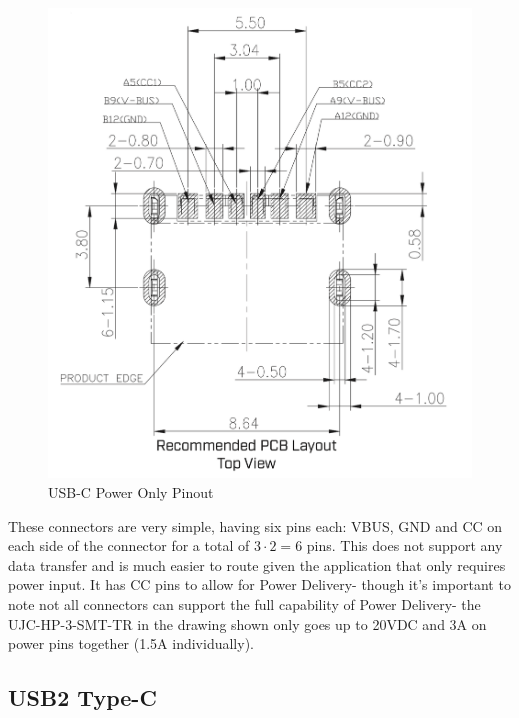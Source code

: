 \documentclass[12pt]{article}
\begin{document}
\begin{figure}[h]
	\centering
	\includegraphics[width=.8\linewidth]{CUI-Devices-Power-Only.png}
	\caption{USB-C Power Only Pinout\protect\footnotemark}
	\label{fig:usb-c-pinout-power-only-CUI}
\end{figure}


\noindent
These connectors are very simple, having six pins each: VBUS, GND and CC on each side of the connector for a total of $3\cdot2 = 6$ pins. This does not support any data transfer and is much easier to route given the application that only requires power input. It has CC pins to allow for Power Delivery- though it's important to note not all connectors can support the full capability of Power Delivery- the UJC-HP-3-SMT-TR in the drawing shown only goes up to 20VDC and 3A on power pins together (1.5A individually). 


\newpage

\subsection{USB2 Type-C}
\end{document}
